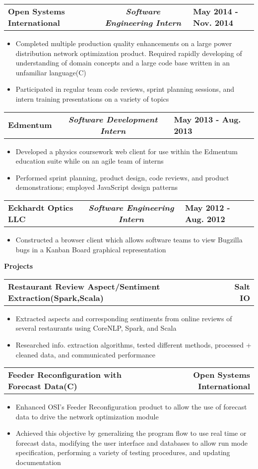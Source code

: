 \documentclass[letterpaper,10pt]{article}
\newcommand{\myitem}{\item[$\triangleright$]}
\newcommand{\resHeading}[1]{{
		\begin{tcolorbox}[size=title, sharp corners, colback=mygrey, colframe=mygrey]
			\centering\textbf{\large #1}
		\end{tcolorbox} 
	}}
\newcommand{\twoColSubHeading}[2]{
		\begin{tabularx}{\columnwidth}{Xr}
				\textbf{#1} & \textbf{#2}
		\end{tabularx}
	}
\newcommand{\threeColSubHeading}[3]{
		\begin{tabularx}{\textwidth}{XcX}
				\textbf{#1} & \textit{\textbf{#2}}  & \hfill\textbf{#3}
		\end{tabularx}
	}
\begin{document}
		\threeColSubHeading{Open Systems International}{Software Engineering Intern}{May 2014 - Nov. 2014}
			\begin{itemize}
				\myitem Completed multiple production quality enhancements on a large power distribution network optimization product. Required rapidly developing of understanding of domain concepts and a large code base written in an unfamiliar language(C)
				\myitem Participated in regular team code reviews, sprint planning sessions, and intern training presentations on a variety of topics
			\end{itemize}
		\threeColSubHeading{Edmentum}{Software Development Intern}{May 2013 - Aug. 2013}
			\begin{itemize}
				\myitem Developed a physics coursework web client for use within the Edmentum education suite while on an agile team of interns
				\myitem Performed sprint planning, product design, code reviews, and product demonstrations; employed JavaScript design patterns
			\end{itemize}
		\threeColSubHeading{Eckhardt Optics LLC}{Software Engineering Intern}{May 2012 - Aug. 2012}
			\begin{itemize}
				\myitem Constructed a browser client which allows software teams to view Bugzilla bugs in a Kanban Board graphical representation
			\end{itemize}
	\resHeading{Projects}
		\twoColSubHeading{Restaurant Review Aspect/Sentiment Extraction(Spark,Scala)}{Salt IO}
			\begin{itemize}
				\myitem Extracted aspects and corresponding sentiments from online reviews of several restaurants using CoreNLP, Spark, and Scala
				\myitem Researched info. extraction algorithms, tested different methods, processed + cleaned data, and communicated performance
			\end{itemize}
		\twoColSubHeading{Feeder Reconfiguration with Forecast Data(C)}{Open Systems International}
			\begin{itemize}
				\myitem Enhanced OSI's Feeder Reconfiguration product to allow the use of forecast data to drive the network optimization module
				\myitem Achieved this objective by generalizing the program flow to use real time or forecast data, modifying the user interface and databases to allow run mode specification, performing a variety of testing procedures, and updating documentation
			\end{itemize}
\end{document}
